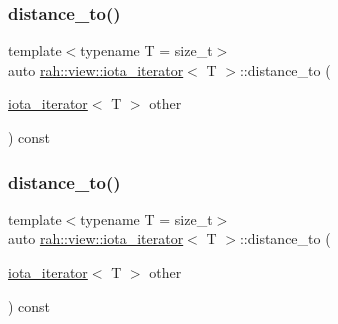 \subsubsection{\texorpdfstring{distance\_to()}{distance\_to()}\hspace{0.1cm}{\footnotesize\ttfamily [1/2]}}
{\footnotesize\ttfamily template$<$typename T  = size\+\_\+t$>$ \\
auto \mbox{\hyperlink{structrah_1_1view_1_1iota__iterator}{rah\+::view\+::iota\+\_\+iterator}}$<$ T $>$\+::distance\+\_\+to (\begin{DoxyParamCaption}\item[{\mbox{\hyperlink{structrah_1_1view_1_1iota__iterator}{iota\+\_\+iterator}}$<$ T $>$}]{other }\end{DoxyParamCaption}) const\hspace{0.3cm}{\ttfamily [inline]}}

\mbox{\label{structrah_1_1view_1_1iota__iterator_a3662abe8721e4c5c7bbc4214e36c4920}} 
\subsubsection{\texorpdfstring{distance\_to()}{distance\_to()}\hspace{0.1cm}{\footnotesize\ttfamily [2/2]}}
{\footnotesize\ttfamily template$<$typename T  = size\+\_\+t$>$ \\
auto \mbox{\hyperlink{structrah_1_1view_1_1iota__iterator}{rah\+::view\+::iota\+\_\+iterator}}$<$ T $>$\+::distance\+\_\+to (\begin{DoxyParamCaption}\item[{\mbox{\hyperlink{structrah_1_1view_1_1iota__iterator}{iota\+\_\+iterator}}$<$ T $>$}]{other }\end{DoxyParamCaption}) const\hspace{0.3cm}{\ttfamily [inline]}}

\mbox{\label{structrah_1_1view_1_1iota__iterator_ada1691e363efa9b5c945a302296e63d5}} 
